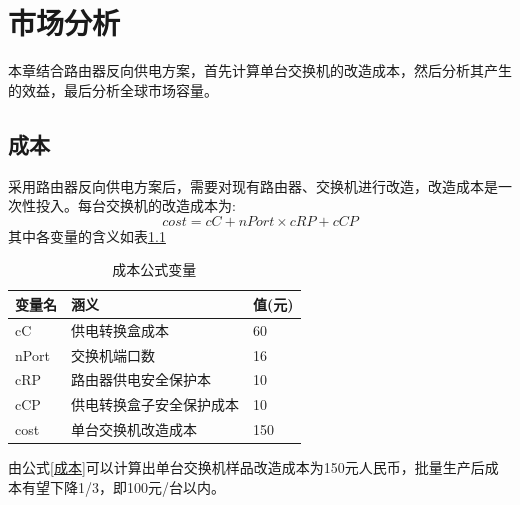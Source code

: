 \documentclass[12pt,a4paper]{report}
\begin{document}
\chapter{市场分析}
本章结合路由器反向供电方案，首先计算单台交换机的改造成本，然后分析其产生的效益，最后分析全球市场容量。
\section{成本}
采用路由器反向供电方案后，需要对现有路由器、交换机进行改造，改造成本是一次性投入。每台交换机的改造成本为:
\begin{equation}
    cost = cC + nPort \times cRP + cCP
    \label{成本}
\end{equation}
其中各变量的含义如表\ref{成本公式变量}
\begin{table}[!hbp]
    \begin{center}
        \begin{tabular}{|l|l|l|}
            \hline
            变量名 & 涵义 & 值(元) \\
            \hline
            cC & 供电转换盒成本 & 60 \\
            \hline
            nPort & 交换机端口数 & 16 \\
            \hline
            cRP & 路由器供电安全保护本 & 10 \\
            \hline
            cCP & 供电转换盒子安全保护成本 & 10 \\
            \hline
            cost & 单台交换机改造成本 & 150 \\
            \hline
        \end{tabular}
        \caption{成本公式变量\label{成本公式变量}}
    \end{center}
\end{table}
由公式\ref{成本}可以计算出单台交换机样品改造成本为150元人民币，批量生产后成本有望下降1/3，即100元/台以内。
\end{document}
